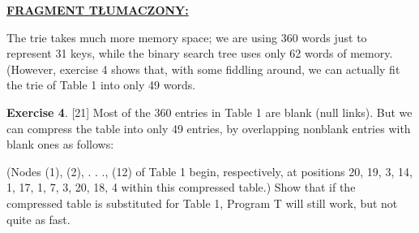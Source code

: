 	\ifsourcematerial
	\begin{displayquote}
		\color{ao(english)}
		\underline{\textbf{FRAGMENT TŁUMACZONY:}} \newline
		
		The trie takes much more memory space; we are using 360 words just to
		represent 31 keys, while the binary search tree uses only 62 words of memory.
		(However, exercise 4 shows that, with some fiddling around, we can actually fit
		the trie of Table 1 into only 49 words.
		
		\textbf{Exercise 4}. [21] Most of the 360 entries in Table 1 are blank (null links). But we can
		compress the table into only 49 entries, by overlapping nonblank entries with
		blank ones as follows:
		
		(Nodes (1), (2), . . ., (12) of Table 1 begin, respectively, at positions 20, 19, 3, 14,
		1, 17, 1, 7, 3, 20, 18, 4 within this compressed table.)
		Show that if the compressed table is substituted for Table 1, Program T will
		still work, but not quite as fast.
	\end{displayquote}
	\fi
